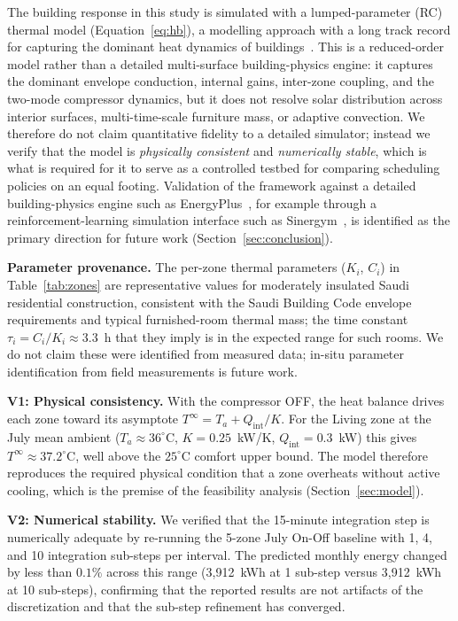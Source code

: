 \documentclass[12pt,a4paper]{article}
\begin{document}
The building response in this study is simulated with a lumped-parameter (RC) thermal model (Equation~\eqref{eq:hb}), a modelling approach with a long track record for capturing the dominant heat dynamics of buildings~\cite{ref39}. This is a reduced-order model rather than a detailed multi-surface building-physics engine: it captures the dominant envelope conduction, internal gains, inter-zone coupling, and the two-mode compressor dynamics, but it does not resolve solar distribution across interior surfaces, multi-time-scale furniture mass, or adaptive convection. We therefore do not claim quantitative fidelity to a detailed simulator; instead we verify that the model is \textit{physically consistent} and \textit{numerically stable}, which is what is required for it to serve as a controlled testbed for comparing scheduling policies on an equal footing. Validation of the framework against a detailed building-physics engine such as EnergyPlus~\cite{ref33}, for example through a reinforcement-learning simulation interface such as Sinergym~\cite{ref34}, is identified as the primary direction for future work (Section~\ref{sec:conclusion}).

\textbf{Parameter provenance.} The per-zone thermal parameters ($K_i$, $C_i$) in Table~\ref{tab:zones} are representative values for moderately insulated Saudi residential construction, consistent with the Saudi Building Code envelope requirements and typical furnished-room thermal mass; the time constant $\tau_i = C_i/K_i \approx 3.3$~h that they imply is in the expected range for such rooms. We do not claim these were identified from measured data; in-situ parameter identification from field measurements is future work.

\textbf{V1: Physical consistency.} With the compressor OFF, the heat balance drives each zone toward its asymptote $T^{\infty} = T_a + Q_{\text{int}}/K$. For the Living zone at the July mean ambient ($T_a \approx 36^\circ$C, $K = 0.25$~kW/K, $Q_{\text{int}} = 0.3$~kW) this gives $T^{\infty} \approx 37.2^\circ$C, well above the $25^\circ$C comfort upper bound. The model therefore reproduces the required physical condition that a zone overheats without active cooling, which is the premise of the feasibility analysis (Section~\ref{sec:model}).

\textbf{V2: Numerical stability.} We verified that the 15-minute integration step is numerically adequate by re-running the 5-zone July On-Off baseline with 1, 4, and 10 integration sub-steps per interval. The predicted monthly energy changed by less than $0.1\%$ across this range (3{,}912~kWh at 1 sub-step versus 3{,}912~kWh at 10 sub-steps), confirming that the reported results are not artifacts of the discretization and that the sub-step refinement has converged.
\end{document}
